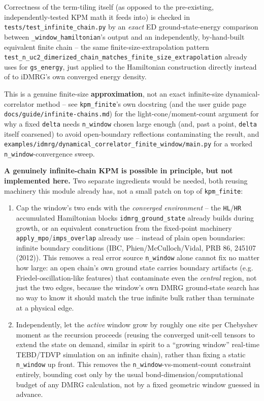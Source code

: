 \documentclass[11pt]{article}
\begin{document}
Correctness of the term-tiling itself (as opposed to the pre-existing,
independently-tested KPM math it feeds into) is checked in
\texttt{tests/test\_infinite\_chain.py} by an \emph{exact} ED
ground-state-energy comparison between \texttt{\_window\_hamiltonian}'s
output and an independently, by-hand-built equivalent finite chain --
the same finite-size-extrapolation pattern
\texttt{test\_n\_uc2\_dimerized\_chain\_matches\_finite\_size\_extrapolation}
already uses for \texttt{gs\_energy}, just applied to the Hamiltonian
construction directly instead of to iDMRG's own converged energy
density.

This is a genuine finite-size \textbf{approximation}, not an exact
infinite-size dynamical-correlator method -- see
\texttt{kpm\_finite}'s own docstring (and
the user guide page \texttt{docs/guide/infinite-chains.md}) for the
light-cone/moment-count argument for why a fixed \texttt{delta} needs
\texttt{n\_window} chosen large enough (and, past a point,
\texttt{delta} itself coarsened) to avoid open-boundary reflections
contaminating the result, and
\texttt{examples/idmrg/dynamical\_correlator\_finite\_window/main.py}
for a worked \texttt{n\_window}-convergence sweep.

\textbf{A genuinely infinite-chain KPM is possible in principle, but
not implemented here.} Two separate ingredients would be needed, both
reusing machinery this module already has, not a small patch on top of
\texttt{kpm\_finite}:

\begin{enumerate}
\item Cap the window's two ends with the \emph{converged environment}
-- the \texttt{HL}/\texttt{HR} accumulated Hamiltonian blocks
\texttt{idmrg\_ground\_state} already builds during growth, or an
equivalent construction from the fixed-point machinery
\texttt{apply\_mpo}/\texttt{imps\_overlap} already use -- instead of
plain open boundaries: infinite boundary conditions (IBC,
Phien/McCulloch/Vidal, PRB 86, 245107 (2012)). This removes a real
error source \texttt{n\_window} alone cannot fix no matter how large:
an open chain's own ground state carries boundary artifacts (e.g.
Friedel-oscillation-like features) that contaminate even the
\emph{central} region, not just the two edges, because the window's
own DMRG ground-state search has no way to know it should match the
true infinite bulk rather than terminate at a physical edge.
\item Independently, let the \emph{active} window grow by roughly one
site per Chebyshev moment as the recursion proceeds (reusing the
converged unit-cell tensors to extend the state on demand, similar in
spirit to a ``growing window'' real-time TEBD/TDVP simulation on an
infinite chain), rather than fixing a static \texttt{n\_window} up
front. This removes the \texttt{n\_window}-vs-moment-count constraint
entirely, bounding cost only by the usual bond-dimension/computational
budget of any DMRG calculation, not by a fixed geometric window
guessed in advance.
\end{enumerate}
\end{document}
